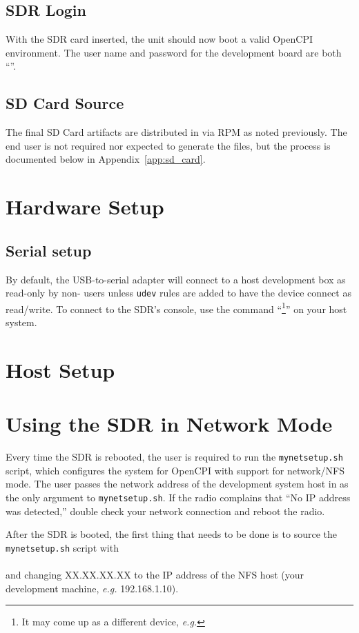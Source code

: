 \subsection{SDR Login}
With the SDR card inserted, the unit should now boot a valid OpenCPI environment. The user name and password for the development board are both ``''.

\subsection{SD Card Source}
The final SD Card artifacts are distributed in  via RPM as noted previously. The end user is not required nor expected to generate the files, but the process is documented below in Appendix~\ref{app:sd_card}.

\section{Hardware Setup}
\subsection{Serial setup}
\label{sec:serial_setup}
By default, the USB-to-serial adapter will connect to a host development box as read-only by non- users unless \texttt{udev} rules are added to have the device connect as read/write. To connect to the SDR's console, use the command ``\footnote{It may come up as a different device, \textit{e.g.} }'' on your host system.

\section{Host Setup}


%

\section{Using the SDR in Network Mode}
\begin{flushleft}
Every time the SDR is rebooted, the user is required to run the \texttt{mynetsetup.sh} script, which configures the system for OpenCPI with support for network/NFS mode. The user passes the network address of the development system host in as the only argument to \texttt{mynetsetup.sh}. If the radio complains that ``No IP address was detected,'' double check your network connection and reboot the radio.\bigskip

After the SDR is booted, the first thing that needs to be done is to source the \texttt{mynetsetup.sh} script with\\
\leavevmode{\parindent=3em\indent} \\
and changing XX.XX.XX.XX to the IP address of the NFS host (your development machine, \textit{e.g.} 192.168.1.10).
\end{flushleft}

